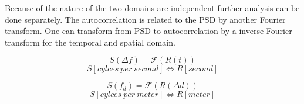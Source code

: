 \begin{where}
\end{where}


Because of the nature of the two domains are independent further analysis can be done separately. %
The autocorrelation is related to the PSD by another Fourier transform. One can transform from PSD to autocorrelation by a inverse Fourier transform for the temporal and spatial domain. 



\begin{equation}
S(\Delta f) = \mathcal{F}(R(t))
\end{equation}
\begin{equation*}
S [cylces \ per \ second] \Leftrightarrow R [second]
\end{equation*}

\begin{equation}
S(f_d) = \mathcal{F}(R(\Delta d ))
\end{equation}
\begin{equation*}
S [cylces \ per \ meter] \Leftrightarrow R [meter]
\end{equation*}








